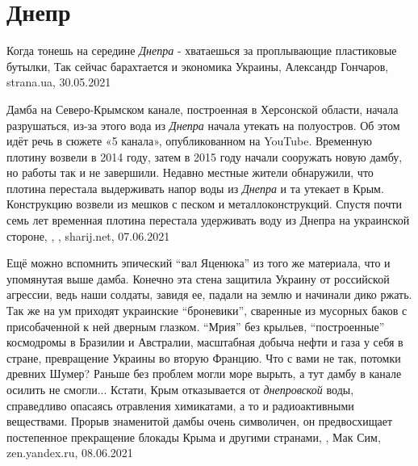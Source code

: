  
 
 
 
 
\chapter{Днепр}

Когда тонешь на середине \emph{Днепра} - хватаешься за проплывающие пластиковые
бутылки, Так сейчас барахтается и экономика Украины, Александр Гончаров,
strana.ua, 30.05.2021

Дамба на Северо-Крымском канале, построенная в Херсонской области, начала
разрушаться, из-за этого вода из \emph{Днепра} начала утекать на полуостров. Об
этом идёт речь в сюжете «5 канала», опубликованном на YouTube. Временную
плотину возвели в 2014 году, затем в 2015 году начали сооружать новую дамбу, но
работы так и не завершили. Недавно местные жители обнаружили, что плотина
перестала выдерживать напор воды из \emph{Днепра} и та утекает в Крым.
Конструкцию возвели из мешков с песком и металлоконструкций. Спустя почти семь
лет временная плотина перестала удерживать воду из Днепра на украинской
стороне,
, , sharij.net, 07.06.2021

Ещё можно вспомнить эпический \enquote{вал Яценюка} из того же материала, что и
упомянутая выше дамба. Конечно эта стена защитила Украину от российской
агрессии, ведь наши солдаты, завидя ее, падали на землю и начинали дико ржать.
Так же на ум приходят украинские \enquote{броневики}, сваренные из мусорных баков с
присобаченной к ней дверным глазком. \enquote{Мрия} без крыльев, \enquote{построенные}
космодромы в Бразилии и Австралии, масштабная добыча нефти и газа у себя в
стране, превращение Украины во вторую Францию. Что с вами не так, потомки
древних Шумер? Раньше без проблем могли море вырыть, а тут дамбу в канале
осилить не смогли...  Кстати, Крым отказывается от \emph{днепровской} воды,
справедливо опасаясь отравления химикатами, а то и радиоактивными веществами.
Прорыв знаменитой дамбы очень символичен, он предвосхищает постепенное
прекращение блокады Крыма и другими странами,
, Мак Сим, zen.yandex.ru, 08.06.2021

